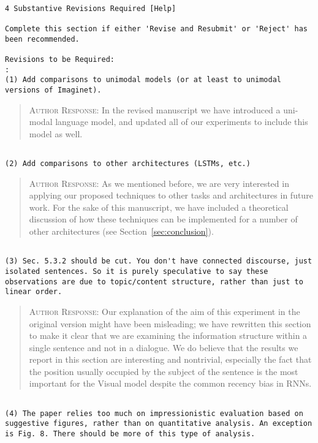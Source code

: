 \begin{verbatim}

4 Substantive Revisions Required [Help]

Complete this section if either 'Revise and Resubmit' or 'Reject' has
been recommended.

Revisions to be Required:
: 
(1) Add comparisons to unimodal models (or at least to unimodal
versions of Imaginet).
\end{verbatim}  
\begin{quote}
\textsc{Author Response:}  In the revised manuscript we have introduced a uni-modal language model, and updated all of our experiments to include this model as well.
\end{quote}
\begin{verbatim}

(2) Add comparisons to other architectures (LSTMs, etc.)
\end{verbatim}  
\begin{quote}
\textsc{Author Response:}  As we mentioned before, we are very interested in 
applying our proposed techniques to other tasks and architectures in future work. 
For the sake of this manuscript, we have included a theoretical discussion of how 
these techniques can be implemented for a number of other architectures (see 
Section~\ref{sec:conclusion}).
\end{quote}
\begin{verbatim}

(3) Sec. 5.3.2 should be cut. You don't have connected discourse, just
isolated sentences. So it is purely speculative to say these
observations are due to topic/content structure, rather than just to
linear order.
\end{verbatim}  
\begin{quote}
\textsc{Author Response:}  Our explanation of the aim of this experiment in the original version might have been misleading; we have rewritten this section to make it clear that we are examining the information structure within a single sentence and not in a dialogue. We do believe that the results we report in this section are interesting and nontrivial, especially the fact that the position usually occupied by the subject of the sentence is the most important for the {\sc Visual} model despite the common recency bias in RNNs.
\end{quote}
\begin{verbatim}

(4) The paper relies too much on impressionistic evaluation based on
suggestive figures, rather than on quantitative analysis. An exception
is Fig. 8. There should be more of this type of analysis.
\end{verbatim}  
